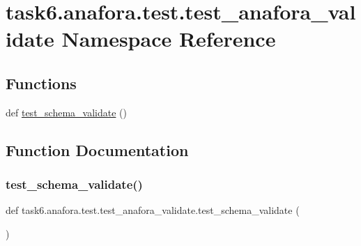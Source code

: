 \hypertarget{namespacetask6_1_1anafora_1_1test_1_1test__anafora__validate}{}\section{task6.\+anafora.\+test.\+test\+\_\+anafora\+\_\+validate Namespace Reference}
\label{namespacetask6_1_1anafora_1_1test_1_1test__anafora__validate}
\subsection*{Functions}
\begin{DoxyCompactItemize}
\item 
def \hyperlink{namespacetask6_1_1anafora_1_1test_1_1test__anafora__validate_a7d780be71b416069bbcd23faae87a12f}{test\+\_\+schema\+\_\+validate} ()
\end{DoxyCompactItemize}


\subsection{Function Documentation}
\mbox{\label{namespacetask6_1_1anafora_1_1test_1_1test__anafora__validate_a7d780be71b416069bbcd23faae87a12f}} 
\subsubsection{\texorpdfstring{test\+\_\+schema\+\_\+validate()}{test\_schema\_validate()}}
{\footnotesize\ttfamily def task6.\+anafora.\+test.\+test\+\_\+anafora\+\_\+validate.\+test\+\_\+schema\+\_\+validate (\begin{DoxyParamCaption}{ }\end{DoxyParamCaption})}

